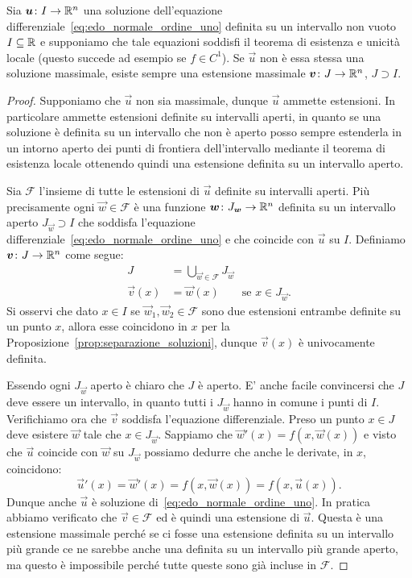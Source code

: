 \begin{theorem}
\label{th:edo_esistenza_massimali}
Sia $\boldsymbol u\colon I\to {\mathbb R}^n$ una soluzione dell'equazione differenziale~\eqref{eq:edo_normale_ordine_uno}
definita su un intervallo non vuoto $I\subseteq {\mathbb R}$
e supponiamo che tale equazioni soddisfi il teorema di esistenza e unicità locale (questo succede ad esempio se $f\in C^1$).
Se $\vec u$ non è essa stessa una soluzione massimale, esiste
sempre una estensione massimale $\boldsymbol v\colon J\to {\mathbb R}^n$, $J\supset I$.
\end{theorem}
%
\begin{proof}
Supponiamo che $\vec u$ non sia massimale, dunque $\vec u$ ammette estensioni. In particolare ammette estensioni definite su intervalli aperti, in quanto se una soluzione è definita su un intervallo che non è aperto posso sempre estenderla in un intorno aperto dei punti di frontiera dell'intervallo mediante il teorema di esistenza locale ottenendo quindi una estensione definita su un intervallo aperto.

Sia $\mathcal F$ l'insieme di tutte le estensioni di $\vec u$ definite su intervalli aperti. Più precisamente ogni $\vec w\in \mathcal F$ è una funzione $\boldsymbol w\colon J_{\boldsymbol w}\to {\mathbb R}^n$ definita su un intervallo aperto $J_{\vec w}\supset I$ che soddisfa l'equazione differenziale~\eqref{eq:edo_normale_ordine_uno} e che coincide con $\vec u$ su $I$. Definiamo $\boldsymbol v\colon J\to{\mathbb R}^n$ come segue:
\begin{align*}
J &= \bigcup_{\vec w \in \mathcal F} J_{\vec w}\\
\vec v(x) &= \vec w(x) \qquad\text{se $x\in J_{\vec w}$}.
\end{align*}
Si osservi che dato $x\in I$ se $\vec w_1, \vec w_2\in\mathcal F$ sono due estensioni entrambe definite su un punto $x$, allora esse coincidono in $x$ per la Proposizione~\ref{prop:separazione_soluzioni}, dunque $\vec v(x)$ è univocamente definita.

Essendo ogni $J_{\vec w}$ aperto è chiaro che $J$ è aperto. E' anche facile convincersi che $J$ deve essere un intervallo, in quanto tutti i $J_{\vec w}$ hanno in comune i punti di $I$.
Verifichiamo ora che $\vec v$ soddisfa l'equazione differenziale. Preso un punto $x\in J$ deve esistere $\vec w$ tale che $x\in J_{\vec w}$. Sappiamo che $\vec w'(x) = f(x,\vec w(x))$ e visto che $\vec u$ coincide con $\vec w$ su $J_{\vec w}$ possiamo dedurre che anche le derivate, in $x$, coincidono:
\[
\vec u'(x) = \vec w'(x) = f(x,\vec w(x)) = f(x,\vec u(x)).
\]
Dunque anche $\vec u$ è soluzione di~\eqref{eq:edo_normale_ordine_uno}.
In pratica abbiamo verificato che $\vec v\in \mathcal F$ ed è quindi una estensione di $\vec u$. 
Questa è una estensione massimale perché se ci fosse una estensione definita su un intervallo 
più grande ce ne sarebbe anche una definita su un intervallo più grande aperto, ma questo è impossibile perché
tutte queste sono già incluse in $\mathcal F$.
\end{proof}


